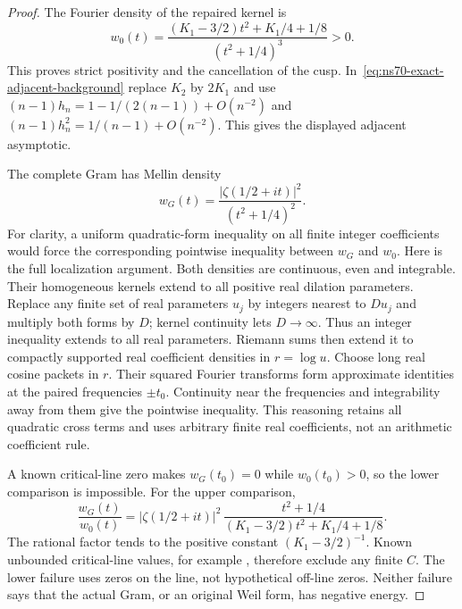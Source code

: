 \documentclass[11pt]{article}
\theoremstyle{remark}
\begin{document}
\begin{proof}
The Fourier density of the repaired kernel is
\begin{equation}
 w_0(t)=\frac{(K_1-3/2)t^2+K_1/4+1/8}{(t^2+1/4)^3}>0.
 \label{eq:ns70-repaired-symbol}
\end{equation}
This proves strict positivity and the cancellation of the cusp.
In~\eqref{eq:ns70-exact-adjacent-background} replace $K_2$ by
$2K_1$ and use
$(n-1)h_n=1-1/(2(n-1))+O(n^{-2})$ and
$(n-1)h_n^2=1/(n-1)+O(n^{-2})$.
This gives the displayed adjacent asymptotic.

The complete Gram has Mellin density
\[
 w_G(t)=\frac{|\zeta(1/2+it)|^2}{(t^2+1/4)^2}.
\]
For clarity, a uniform quadratic-form inequality on all finite integer
coefficients would force the corresponding pointwise inequality between
$w_G$ and $w_0$. Here is the full localization argument. Both densities
are continuous, even and integrable. Their homogeneous kernels extend
to all positive real dilation parameters. Replace any finite set of real
parameters $u_j$ by integers nearest to $D u_j$ and multiply both forms
by $D$; kernel continuity lets $D\to\infty$. Thus an integer inequality
extends to all real parameters. Riemann sums then extend it to compactly
supported real coefficient densities in $r=\log u$. Choose long real
cosine packets in $r$. Their squared Fourier transforms form approximate
identities at the paired frequencies $\pm t_0$. Continuity near the
frequencies and integrability away from them give the pointwise inequality.
This reasoning retains all quadratic cross terms and uses arbitrary
finite real coefficients, not an arithmetic coefficient rule.

A known critical-line zero makes $w_G(t_0)=0$ while $w_0(t_0)>0$,
so the lower comparison is impossible. For the upper comparison,
\[
 \frac{w_G(t)}{w_0(t)}
 =|\zeta(1/2+it)|^2\,
   \frac{t^2+1/4}{(K_1-3/2)t^2+K_1/4+1/8}.
\]
The rational factor tends to the positive constant $(K_1-3/2)^{-1}$.
Known unbounded critical-line values, for example
\cite[Theorem 1]{Soundararajan2008}, therefore exclude any finite $C$.
The lower failure uses zeros on the line, not hypothetical off-line zeros.
Neither failure says that the actual Gram, or an original Weil form, has
negative energy.
\end{proof}
\end{document}
